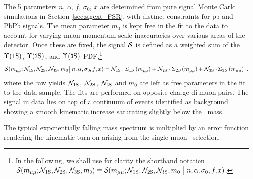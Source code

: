   The 5 parameters $n$, $\alpha$, $f$, $\sigma_{0}$, $x$ are
  determined from pure signal Monte Carlo simulations in Section~\ref{sec:sigext_FSR}, with distinct
  constraints for pp and PbPb signals. The mean
  parameter $m_0$ is kept free in the fit to the data to account for varying
  muon momentum scale inaccuracies over various areas of the detector.
%
Once these are fixed, the signal  ${\cal S}$ is defined as a weighted sum of the $\Upsilon\mathrm{(1S)}$, $\Upsilon\mathrm{(2S)}$, and $\Upsilon\mathrm{(3S)}$ PDF,\footnote{In the following, we shall use for clarity the shorthand notation 
${\cal S}(m_{\mu\mu}; {\cal N}_{\rm 1S}, {\cal N}_{\rm 2S}, {\cal N}_{\rm 3S}, m_{0})\equiv{\cal S}(m_{\mu\mu}; {\cal N}_{\rm 1S}, {\cal N}_{\rm 2S}, {\cal N}_{\rm 3S}, m_{0}\ \big|\ n, \alpha, \sigma_{0}, f, x)$.}
\begin{equation} \label{eq:TheSignalPDF}
 \Sig(m_{\mu\mu}; \NFitOneS, \NFitTwoS, \NFitThreeS, m_{0} \big|\ n, \alpha, \sigma_{0}, f, x)
 = \\ \NFitOneS\cdot\Sigma_{1S}\left( m_{\mu\mu} \right)  +
 \NFitTwoS\cdot\Sigma_{2S}\left( m_{\mu\mu} \right)  +  \NFitThreeS\cdot\Sigma_{3S}\left( m_{\mu\mu} \right) \ .
\end{equation}
where the raw yields ${\cal N}_{\rm 1S}$, ${\cal N}_{\rm 2S}$, ${\cal N}_{\rm 3S}$ and
$m_{0}$ are left as free parameters in the fit to the data sample.%
The fits are performed on opposite-charge di-muon pairs. 
The signal in data lies on top of a continuum of events identified as
background showing a smooth kinematic increase saturating slightly below the \PgU\ mass.

The typical exponentially falling mass spectrum is multiplied by
an error function  rendering the kinematic turn-on arising from the
single muon \pt\ selection. 

